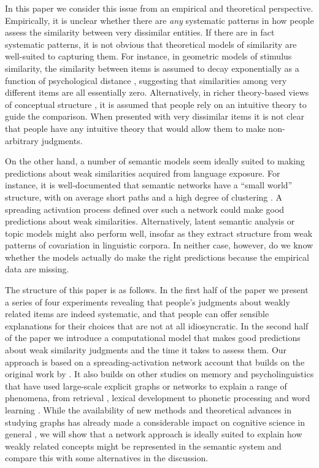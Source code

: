 \documentclass[doc]{apa6}
\begin{document}
In this paper we consider this issue from an empirical and theoretical perspective. Empirically, it is unclear whether there are {\it any} systematic patterns in how people assess the similarity between very dissimilar entities. If there are in fact systematic patterns, it is not obvious that theoretical models of similarity are well-suited to capturing them. For instance, in geometric models of stimulus similarity, the similarity between items is assumed to decay exponentially as a function of psychological distance \parencite{Shepard1987}, suggesting that similarities among very different items are all essentially zero. Alternatively, in richer theory-based views of conceptual structure \parencite{Murphy1985}, it is assumed that people rely on an intuitive theory to guide the comparison. When presented with very dissimilar items it is not clear that people have any intuitive theory that would allow them to make non-arbitrary judgments.

On the other hand, a number of semantic models seem ideally suited to making predictions about weak similarities acquired from language exposure. For instance, it is well-documented that semantic networks have a ``small world'' structure, with on average short paths and a high degree of clustering \parencite{DeDeyne2008b,Steyvers2005}. A spreading activation process defined over such a network \parencite[e.g.][]{Collins1975} could make good predictions about weak similarities. Alternatively, latent semantic analysis \parencite{Landauer1997} or topic models \parencite{Griffiths2007} might also perform well, insofar as they extract structure from weak patterns of covariation in linguistic corpora. In neither case, however, do we know whether the models actually do make the right predictions because the empirical data are missing.

The structure of this paper is as follows. In the first half of the paper we present a series of four experiments revealing that people's judgments about weakly related items are indeed systematic, and that people can offer sensible explanations for their choices that are not at all idiosyncratic. In the second half of the paper we introduce a computational model that makes good predictions about weak similarity judgments and the time it takes to assess them.  Our approach is based on a spreading-activation network account that builds on the original work by \textcite{Collins1975}. It also builds on other studies on memory and psycholinguistics that have used large-scale explicit graphs or networks to explain a range of phenomena, from retrieval \parencite{Lerner2009}, lexical development \parencite{Steyvers2005,Hills2009longitudinal} to phonetic processing and word learning \parencite{Vitevitch2008}. While the availability of new methods and theoretical advances in studying graphs has already made a considerable impact on cognitive science in general \parencite{Baronchelli2013}, we will show that a network approach is ideally suited to explain how weakly related concepts might be represented in the semantic system and compare this with some alternatives in the discussion.
\end{document}
